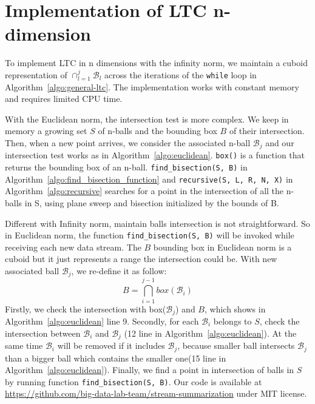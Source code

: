 \section{Implementation of LTC n-dimension}

To implement LTC in n dimensions with the infinity norm, we maintain a cuboid
representation of $\cap_{l=1}^j{\mathcal{B}_l}$ across the
iterations of the \texttt{while} loop in
Algorithm~\ref{algo:general-ltc}. The implementation works with
constant memory and requires limited CPU time.

With the Euclidean norm, the intersection test is more complex. We keep in
memory a growing set $S$ of n-balls and the bounding box $B$ of their
intersection. Then, when a new point arrives, we consider the associated n-ball
$\mathcal{B}_j$ and our intersection test works as in
Algorithm~\ref{algo:euclidean}. \texttt{box()} is a function that returns the
bounding box of an n-ball. \texttt{find\_bisection(S, B)} in
Algorithm~\ref{algo:find_bisection_function} and \texttt{recursive(S, L, R,
N, X)} in Algorithm~\ref{algo:recursive} searches for a point in the
intersection of all the n-balls in S, using plane sweep and bisection
initialized by the bounds of B.

Different with Infinity norm, maintain balls intersection is not
straightforward. So in Euclidean norm, the function  \texttt{find\_bisection(S,
B)} will be invoked while receiving each new data  stream. The $B$ bounding box
in Euclidean norm is a cuboid but it just  represents a range the intersection
could be. With new associated ball  $\mathcal{B}_j$, we re-define it as follow:
\begin{equation*}
    B = \bigcap_{i=1}^{j-1} box(\mathcal{B}_i) 
\end{equation*}
Firstly, we check the intersection with box($\mathcal{B}_j$) and $B$, which
shows in Algorithm~\ref{algo:euclidean} line 9. Secondly, for each
$\mathcal{B}_i$ belongs to $S$, check the intersection between $\mathcal{B}_i$
and $\mathcal{B}_j$ (12 line in Algorithm~\ref{algo:euclidean}). At the same
time $\mathcal{B}_i$ will be removed if it includes $\mathcal{B}_j$, because
smaller ball intersects $\mathcal{B}_j$ than a bigger ball which contains the
smaller one(15 line in Algorithm~\ref{algo:euclidean}). Finally, we find a point
in intersection of balls in $S$ by running function \texttt{find\_bisection(S,
B)}.  Our code is available at
\url{https://github.com/big-data-lab-team/stream-summarization} under MIT
license. 

